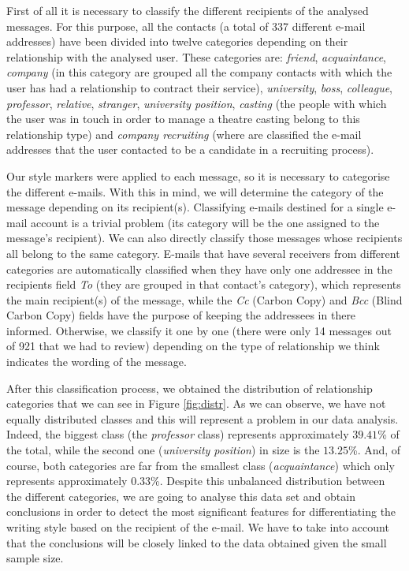 First of all it is necessary to classify the different recipients of the analysed messages. For this purpose, all the contacts (a total of 337 different e-mail addresses) have been divided into twelve categories depending on their relationship with the analysed user. These categories are: \textit{friend}, \textit{acquaintance}, \textit{company} (in this category are grouped all the company contacts with which the user has had a relationship to contract their service), \textit{university}, \textit{boss}, \textit{colleague}, \textit{professor}, \textit{relative}, \textit{stranger}, \textit{university position}, \textit{casting} (the people with which the user was in touch in order to manage a theatre casting belong to this relationship type) and \textit{company recruiting} (where are classified the e-mail addresses that the user contacted to be a candidate in a recruiting process).

Our style markers were applied to each message, so it is necessary to categorise the different e-mails. With this in mind, we will determine the category of the message depending on its recipient(s). Classifying e-mails destined for a single e-mail account is a trivial problem (its category will be the one assigned to the message's recipient). We can also directly classify those messages whose recipients all belong to the same category. E-mails that have several receivers from different categories are automatically classified when they have only one addressee in the recipients field \textit{To} (they are grouped in that contact's category), which represents the main recipient(s) of the message, while the \textit{Cc} (Carbon Copy) and \textit{Bcc} (Blind Carbon Copy) fields have the purpose of keeping the addressees in there informed. Otherwise, we classify it one by one (there were only 14 messages out of 921 that we had to review) depending on the type of relationship we think indicates the wording of the message.

After this classification process, we obtained the distribution of relationship categories that we can see in Figure \ref{fig:distr}. As we can observe, we have not equally distributed classes and this will represent a problem in our data analysis. Indeed, the biggest class (the \textit{professor} class) represents approximately $39.41$\% of the total, while the second one (\textit{university position}) in size is the $13.25$\%. And, of course, both categories are far from the smallest class (\textit{acquaintance}) which only represents approximately $0.33$\%. Despite this unbalanced distribution between the different categories, we are going to analyse this data set and obtain conclusions in order to detect the most significant features for differentiating the writing style based on the recipient of the e-mail. We have to take into account that the conclusions will be closely linked to the data obtained given the small sample size.

